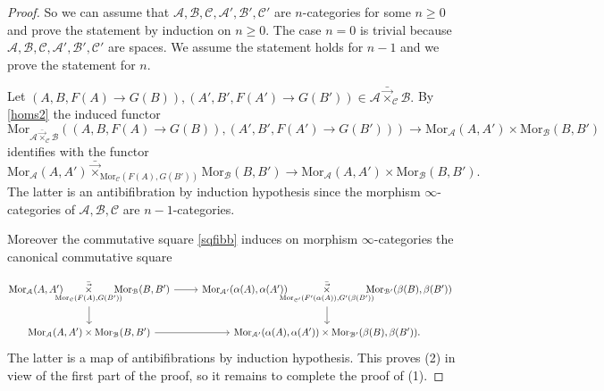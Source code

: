 \documentclass[10pt,oneside]{article}
\numberwithin{equation}{section} %
\numberwithin{figure}{section} %
\theoremstyle{plain}
\theoremstyle{definition}
\newcommand{\mA}{{\mathcal A}}
\newcommand{\mB}{{\mathcal B}}
\newcommand{\mC}{{\mathcal C}}
\newcommand{\n}{{n}}
\newcommand{\Mor}{{\mathrm{Mor}}}
\begin{document}
\begin{proof}
So we can assume that $\mA,\mB,\mC,\mA',\mB',\mC'$ are $n$-categories for some $\n \geq 0$ and prove the 
statement by induction on $n \geq 0$.
The case $n=0$ is trivial because $\mA,\mB,\mC,\mA',\mB',\mC'$ are spaces. 
We assume the statement holds for $n-1$ and we prove the statement for $n.$


Let $(A, B, F(A) \to G(B)), (A', B', F(A') \to G(B')) \in \mA {\bar{\vec{\times}}}_{\mC} \mB.$ 
By \ref{homs2} the induced functor $$\Mor_{\mA {\bar{\vec{\times}}}_{\mC} \mB}((A, B, F(A) \to G(B)), (A', B', F(A') \to G(B'))) \to \Mor_\mA(A,A') \times \Mor_\mB(B,B')$$
identifies with the functor 
$$ {\Mor_\mA(A,A') {{\bar{\vec{\times}}}}_{\Mor_\mC(F(A),G(B'))}} \Mor_\mB(B,B') \to \Mor_\mA(A,A') \times \Mor_\mB(B,B').$$
The latter is an antibifibration by induction hypothesis since 
the morphism $\infty$-categories of $\mA,\mB,\mC$ are $n-1$-categories.


Moreover the commutative square \ref{sqfibb} induces on morphism $\infty$-categories the canonical commutative square

\begin{equation*}
\!\!\begin{tikzcd}
\Mor_\mA(A,A') \!\!\!\!\!\underset{\Mor_\mC(F(A),G(B'))}{{\bar{\vec{\times}}} } \!\!\!\!\!\Mor_\mB(B,B') \ar{r}{} \ar{d}[swap]{} &  \Mor_{\mA'}(\alpha(A),\alpha(A')) \!\!\!\!\!\underset{\Mor_{\mC'}(F'(\alpha(A)),G'(\beta(B'))}{{\bar{\vec{\times}}}}  \!\!\!\!\!\Mor_{\mB'}(\beta(B),\beta(B')) \ar{d}{} \\
\Mor_{\mA}(A,A') \times \Mor_{\mB}(B,B')  \ar{r}[swap]{} & \Mor_{\mA'}(\alpha(A),\alpha(A')) \times \Mor_{\mB'}(\beta(B),\beta(B')). 
\end{tikzcd}
\end{equation*}
The latter is a map of antibifibrations by induction hypothesis.
This proves (2) in view of the first part of the proof, so it remains to complete the proof of (1).

 


\end{proof}
\end{document}
